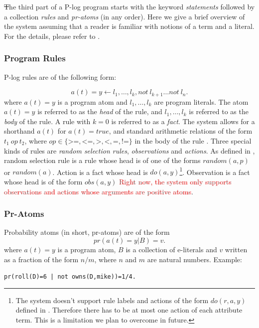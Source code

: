 \documentclass[12pt, letterpaper]{article}
\begin{document}
\st The third part of a P-log program starts with the keyword \textit{statements} followed by a collection \textit{rules} and \textit{pr-atoms} (in any order). Here we give a brief overview of the system assuming that a reader is familiar with notions of a term and a literal. For the details, please refer to \cite{Balai2019}. 

\subsubsection{Program Rules}
P-log rules are of the following form:

\begin{equation}
   a(t) = y \leftarrow l_1,  \ldots, l_k, not~l_{k+1} \ldots not~l_{n}.
 \end{equation}
where $a(t) = y$ is a program atom and $l_1,\ldots,l_k$ are program literals.
The atom $a(t) = y$ is referred to as the \textit{head} of the rule, and $l_1,\ldots,l_k$ is referred to as the \textit{body} of the rule.
 A rule with $k=0$ is referred to as a \textit{fact}.
 The system allows for a shorthand $a(t)$ for $a(t) = true$, and standard arithmetic relations of the form $t_1~op~t_2$, where $op \in \{\texttt{>=},\texttt{<=},\texttt{>},\texttt{<},\texttt{=},\texttt{!=}\}$ in the body of the rule .
 Three special kinds of rules are \textit{random selection rules}, \textit{observations} and \textit{actions}.
 As defined in \cite{Balai2019},
 random selection rule is a rule whose head is of one of the forms $random(a,p)$ or $random(a)$. Action is a fact whose head is $do(a,y)$\footnote{The system doesn't support rule labels and actions of the form $do(r,a,y)$ defined in \cite{Balai2019}. Therefore there has to be at most one action of each attribute term. This is a limitation we plan to overcome in future.}.
 Observation is a fact whose head is of the form $obs(a,y)$ \textcolor{red}{Right now, the system only supports observations and actions whose arguments are positive atoms}.

 \subsubsection{Pr-Atoms}

 Probability atoms (in short, pr-atoms) are of the form 
 $$pr(a(t) = y | B) = v.$$
 where $a(t) = y$ is a program atom, $B$ is a collection of e-literals and $v$  written as a fraction of the form $n/m$, where $n$ and $m$ are natural numbers.  Example:
\begin{center}
 \texttt{pr(roll(D)=6 | not owns(D,mike))=1/4.}
\end{center}
\end{document}
